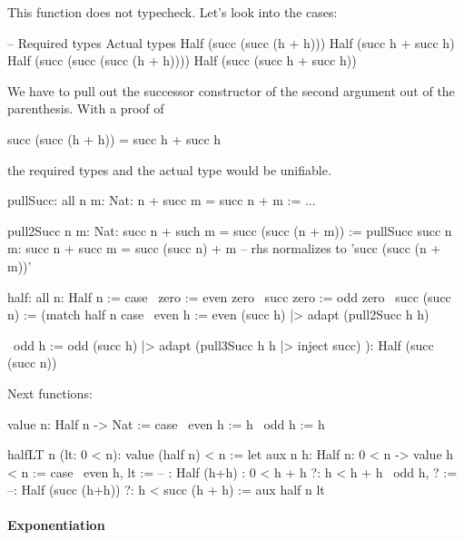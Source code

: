This function does not typecheck. Let's look into the cases:
\begin{alba}
    --  Required types                          Actual types
        Half (succ (succ (h + h)))              Half (succ h + succ h)
        Half (succ (succ (succ (h + h))))       Half (succ (succ h + succ h))
\end{alba}
We have to pull out the successor constructor of the second argument out of the
parenthesis. With a proof of
\begin{alba}
    succ (succ (h + h)) = succ h + succ h
\end{alba}
the required types and the actual type would be unifiable.

\begin{alba}
    pullSucc: all {n m: Nat}: n + succ m = succ n + m
    := ...

    pull2Succ {n m: Nat}: succ n + such m = succ (succ (n + m))
    :=
        pullSucc {succ n} {m}: succ n + succ m = succ (succ n) + m
        -- rhs normalizes to 'succ (succ (n + m))'


    half: all n: Half n := case
        \ zero          :=   even zero
        \ succ zero     :=   odd zero
        \ succ (succ n) :=
            (match half n case
                \ even h :=
                    even (succ h)
                    |> adapt (pull2Succ {h} {h})

                \ odd  h :=
                    odd  (succ h)
                    |> adapt (pull3Succ {h} {h} |> inject succ)
            ): Half (succ (succ n))
\end{alba}




Next functions:

\begin{alba}
    value {n}: Half n -> Nat := case
        \ even h := h
        \ odd  h := h

    halfLT {n} (lt: 0 < n):  value (half n) < n :=
        let
            aux {n} {h: Half n}: 0 < n  ->  value h < n := case
                \ {even h},       lt :=
                -- : Half (h+h)   : 0 < h + h
                    ?: h < h + h
                \ {odd h},              ? :=
                --: Half (succ (h+h))
                    ?: h < succ (h + h)
        := aux {half n} lt
\end{alba}






\paragraph{Exponentiation}


